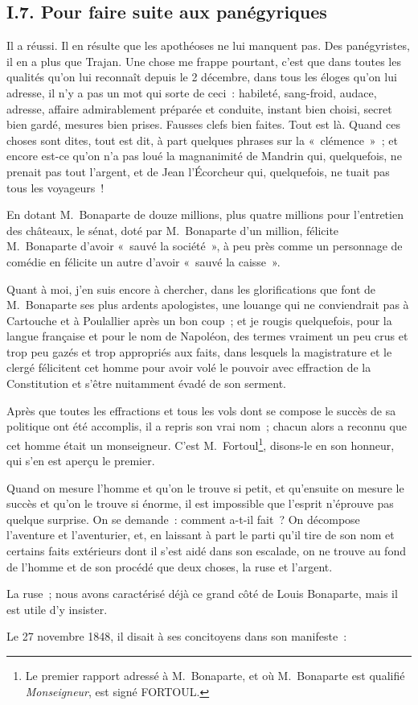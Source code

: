 \documentclass[french,twoside]{book} %
\begin{document}
\subsection[{I.7. Pour faire suite aux panégyriques}]{I.7. Pour faire suite aux panégyriques}
\noindent Il a réussi. Il en résulte que les apothéoses ne lui manquent pas. Des panégyristes, il en a plus que Trajan. Une chose me frappe pourtant, c’est que dans toutes les qualités qu’on lui reconnaît depuis le 2 décembre, dans tous les éloges qu’on lui adresse, il n’y a pas un mot qui sorte de ceci : habileté, sang-froid, audace, adresse, affaire admirablement préparée et conduite, instant bien choisi, secret bien gardé, mesures bien prises. Fausses clefs bien faites. Tout est là. Quand ces choses sont dites, tout est dit, à part quelques phrases sur la « clémence » ; et encore est-ce qu’on n’a pas loué la magnanimité de Mandrin qui, quelquefois, ne prenait pas tout l’argent, et de Jean l’Écorcheur qui, quelquefois, ne tuait pas tous les voyageurs !\par
En dotant M. Bonaparte de douze millions, plus quatre millions pour l’entretien des châteaux, le sénat, doté par M. Bonaparte d’un million, félicite M. Bonaparte d’avoir « sauvé la société », à peu près comme un personnage de comédie en félicite un autre d’avoir « sauvé la caisse ».\par
Quant à moi, j’en suis encore à chercher, dans les glorifications que font de M. Bonaparte ses plus ardents apologistes, une louange qui ne conviendrait pas à Cartouche et à Poulallier après un bon coup ; et je rougis quelquefois, pour la langue française et pour le nom de Napoléon, des termes vraiment un peu crus et trop peu gazés et trop appropriés aux faits, dans lesquels la magistrature et le clergé félicitent cet homme pour avoir volé le pouvoir avec effraction de la Constitution et s’être nuitamment évadé de son serment.\par
Après que toutes les effractions et tous les vols dont se compose le succès de sa politique ont été accomplis, il a repris son vrai nom ; chacun alors a reconnu que cet homme était un monseigneur. C’est M. Fortoul\footnote{Le premier rapport adressé à M. Bonaparte, et où M. Bonaparte est qualifié \emph{Monseigneur}, est signé FORTOUL.}, disons-le en son honneur, qui s’en est aperçu le premier.\par
Quand on mesure l’homme et qu’on le trouve si petit, et qu’ensuite on mesure le succès et qu’on le trouve si énorme, il est impossible que l’esprit n’éprouve pas quelque surprise. On se demande : comment a-t-il fait ? On décompose l’aventure et l’aventurier, et, en laissant à part le parti qu’il tire de son nom et certains faits extérieurs dont il s’est aidé dans son escalade, on ne trouve au fond de l’homme et de son procédé que deux choses, la ruse et l’argent.\par
La ruse ; nous avons caractérisé déjà ce grand côté de Louis Bonaparte, mais il est utile d’y insister.\par
Le 27 novembre 1848, il disait à ses concitoyens dans son manifeste :\par
\end{document}
